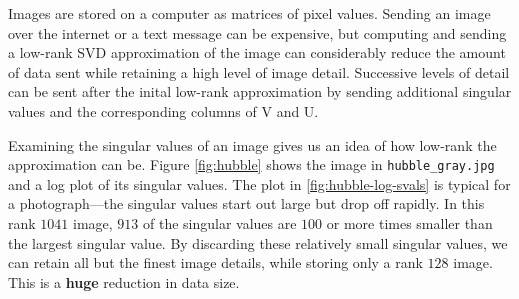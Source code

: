 Images are stored on a computer as matrices of pixel values.
Sending an image over the internet or a text message can be expensive, but computing and sending a low-rank SVD approximation of the image can considerably reduce the amount of data sent while retaining a high level of image detail.
Successive levels of detail can be sent after the inital low-rank approximation by sending additional singular values and the corresponding columns of V and U.

Examining the singular values of an image gives us an idea of how low-rank the approximation can be.
Figure \ref{fig:hubble} shows the image in \texttt{hubble\_gray.jpg} and a log plot of its singular values.
The plot in \ref{fig:hubble-log-svals} is typical for a photograph---the singular values start out large but drop off rapidly.
In this rank $1041$ image, $913$ of the singular values are $100$ or more times smaller than the largest singular value.
By discarding these relatively small singular values, we can retain all but the finest image details, while storing only a rank $128$ image.
This is a \textbf{huge} reduction in data size.


